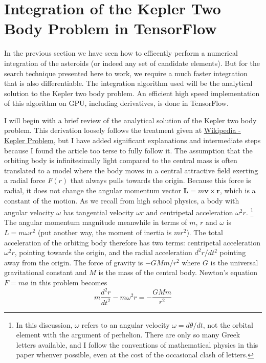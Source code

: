 \section{Integration of the Kepler Two Body Problem in TensorFlow}
\label{section_kepler_two_body_tensorflow}
In the previous section we have seen how to efficently perform a numerical integration of the asteroids (or indeed any set of candidate elements).
But for the search technique presented here to work, we require a much faster integration that is also differentiable.
The integration algorithm used will be the analytical solution to the Kepler two body problem.
An efficient high speed implementation of this algorithm on GPU, including derivatives, is done in TensorFlow.

I will begin with a brief review of the analytical solution of the Kepler two body problem.
This derivation loosely follows the treatment given at \href{https://en.wikipedia.org/wiki/Kepler_problem}{Wikipedia - Kepler Problem},
but I have added significant explanations and intermediate steps because I found the article too terse to fully follow it.
The assumption that the orbiting body is infinitesimally light compared to the central mass is often translated to a model 
where the body moves in a central attractive field exerting a radial force $F(r)$ that always pulls towards the origin.
Because this force is radial, it does not change the angular momentum vector $\mathbf{L} = m\mathbf{v} \times \mathbf{r}$, 
which is a constant of the motion.
As we recall from high school physics, a body with angular velocity $\omega$ has tangential velocity $\omega r$
and centripetal acceleration $\omega^2 r$.
\footnote{
In this discussion, $\omega$ refers to an angular velocity $\omega = d\theta / dt$, not the orbital element with the argument of perhelion.
There are only so many Greek letters available, and I follow the conventions of mathematical physics in this paper whenver possible,
even at the cost of the occasional clash of letters.}
The angular momentum magnitude meanwhile in terms of $m$, $r$ and $\omega$ is $L = m \omega r^2$ 
(put another way, the moment of inertia is $mr^2$).
The total acceleration of the orbiting body therefore has two terms: centripetal acceleration $\omega^2r$, pointing towards the origin,
and the radial acceleration $d^2r / dt^2$ pointing away from the origin.
The force of gravity is $-G M m / r^2$ where $G$ is the universal gravitational constant and $M$ is the mass of the central body.
Newton's equation $F = ma$ in this problem becomes
$$ m \frac{d^2r}{dt^2} - m \omega^2 r = - \frac{G M m }{r^2}$$
